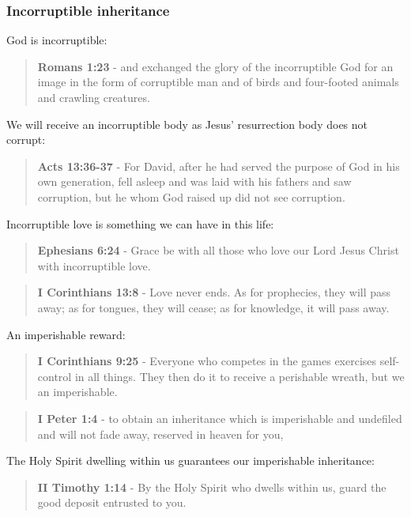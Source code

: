 \documentclass[11pt]{article}
\begin{document}
\subsubsection{Incorruptible inheritance}
\label{sec:org1b6317d}
God is incorruptible:

\begin{quote}
\textbf{Romans 1:23} - and exchanged the glory of the incorruptible God for an image in the form of corruptible man and of birds and four-footed animals and crawling creatures.
\end{quote}

We will receive an incorruptible body as Jesus' resurrection body does not corrupt:

\begin{quote}
\textbf{Acts 13:36-37} - For David, after he had served the purpose of God in his own generation, fell asleep and was laid with his fathers and saw corruption, but he whom God raised up did not see corruption.
\end{quote}

Incorruptible love is something we can have in this life:

\begin{quote}
\textbf{Ephesians 6:24} - Grace be with all those who love our Lord Jesus Christ with incorruptible love.
\end{quote}

\begin{quote}
\textbf{I Corinthians 13:8} - Love never ends. As for prophecies, they will pass away; as for tongues, they will cease; as for knowledge, it will pass away.
\end{quote}

An imperishable reward:

\begin{quote}
\textbf{I Corinthians 9:25} - Everyone who competes in the games exercises self-control in all things. They then do it to receive a perishable wreath, but we an imperishable.
\end{quote}

\begin{quote}
\textbf{I Peter 1:4} - to obtain an inheritance which is imperishable and undefiled and will not fade away, reserved in heaven for you,
\end{quote}

The Holy Spirit dwelling within us guarantees our imperishable inheritance:

\begin{quote}
\textbf{II Timothy 1:14} - By the Holy Spirit who dwells within us, guard the good deposit entrusted to you.
\end{quote}
\end{document}
